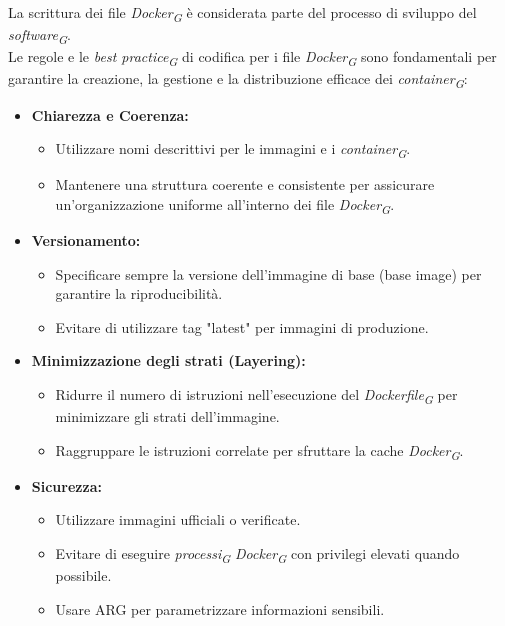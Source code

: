 La scrittura dei file \textit{Docker}\textsubscript{\textit{G}} è considerata parte del processo di sviluppo del \textit{software}\textsubscript{\textit{G}}. \\
Le regole e le \textit{best practice}\textsubscript{\textit{G}} di codifica per i file \textit{Docker}\textsubscript{\textit{G}} sono fondamentali per garantire la creazione, la gestione e la distribuzione efficace dei \textit{container}\textsubscript{\textit{G}}:
\begin{itemize}
    \item \textbf{Chiarezza e Coerenza:}
    \begin{itemize}
        \item Utilizzare nomi descrittivi per le immagini e i \textit{container}\textsubscript{\textit{G}}.
        \item Mantenere una struttura coerente e consistente per assicurare un'organizzazione uniforme all'interno dei file \textit{Docker}\textsubscript{\textit{G}}.
    \end{itemize}

\item \textbf{Versionamento:}
    \begin{itemize}
        \item Specificare sempre la versione dell'immagine di base (base image) per garantire la riproducibilità.
        \item Evitare di utilizzare tag "latest" per immagini di produzione.
    \end{itemize}

\item \textbf{Minimizzazione degli strati (Layering):}
    \begin{itemize}
        \item Ridurre il numero di istruzioni nell'esecuzione del \textit{Dockerfile}\textsubscript{\textit{G}} per minimizzare gli strati dell'immagine.
        \item Raggruppare le istruzioni correlate per sfruttare la cache \textit{Docker}\textsubscript{\textit{G}}.
    \end{itemize}

\item \textbf{Sicurezza:}
    \begin{itemize}
        \item Utilizzare immagini ufficiali o verificate.
        \item Evitare di eseguire \textit{processi}\textsubscript{\textit{G}} \textit{Docker}\textsubscript{\textit{G}} con privilegi elevati quando possibile.
        \item Usare ARG per parametrizzare informazioni sensibili.
    \end{itemize}


\end{itemize}
